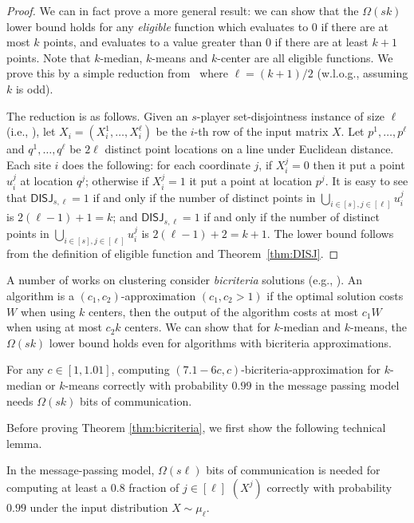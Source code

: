 \begin{proof}
We can in fact prove a more general result: we can show that the $\Omega(sk)$ lower bound holds for any {\em eligible} function which evaluates to $0$ if there are at most $k$ points, and evaluates to a value greater than $0$ if there are at least $k+1$ points.  Note that $k$-median, $k$-means and $k$-center are all eligible functions.  We prove this by a simple reduction from \DISJL\ where $\ell = (k+1)/2$ (w.l.o.g., assuming $k$ is odd). 

The reduction is as follows. Given an $s$-player set-disjointness instance of size $\ell$ (i.e., \DISJL), let $X_i = (X_i^1, \ldots, X_i^\ell)$ be the $i$-th row of the input matrix $X$.  Let $p^1, \ldots, p^\ell$ and $q^1, \ldots, q^\ell$ be $2\ell$ distinct point locations on a line under Euclidean distance.  Each site $i$ does the following: for each coordinate $j$, if $X_i^j = 0$ then it put a point $u_i^j$ at location $q^j$; otherwise if $X_i^j = 1$ it put a point at location $p^j$.  It is easy to see that $\mathsf{DISJ}_{s,\ell} = 1$ if and only if the number of distinct points in $\bigcup_{i \in [s], j \in [\ell]} u_i^j$ is $2(\ell - 1) + 1 = k$; and $\mathsf{DISJ}_{s,\ell} = 1$ if and only if the number of distinct points in $\bigcup_{i \in [s], j \in [\ell]} u_i^j$ is $2(\ell - 1) + 2 = k  + 1$.  The lower bound follows from the definition of eligible function and Theorem~\ref{thm:DISJ}.
\end{proof}


A number of works on clustering consider {\em bicriteria} solutions (e.g., \cite{KPR98,CKMN01}). An algorithm is a $(c_1, c_2)$-approximation $(c_1, c_2 > 1)$ if the optimal solution costs $W$ when using $k$ centers, then the output of the algorithm costs at most $c_1 W$ when using at most $c_2 k$ centers.  We can show that for $k$-median and $k$-means, the $\Omega(sk)$ lower bound  holds even for algorithms with bicriteria approximations.  
\begin{thm}
\label{thm:bicriteria}

For any $c \in [1, 1.01]$, computing $(7.1 - 6c, c)$-bicriteria-approximation for $k$-median or $k$-means  correctly with probability $0.99$ in the message passing model needs $\Omega(sk)$ bits of communication.
\end{thm}


\label{app:proof-bicriteria}
Before proving Theorem \ref{thm:bicriteria}, we first show the following technical lemma.  
\begin{lem}
\label{lem:direct-sum}
In the message-passing model, $\Omega(s \ell)$ bits of communication is needed for computing at least a $0.8$ fraction of $j \in [\ell]$ \ONE$(X^j)$ correctly with probability $0.99$ under the input distribution $X \sim \mu_\ell$.
\end{lem}

